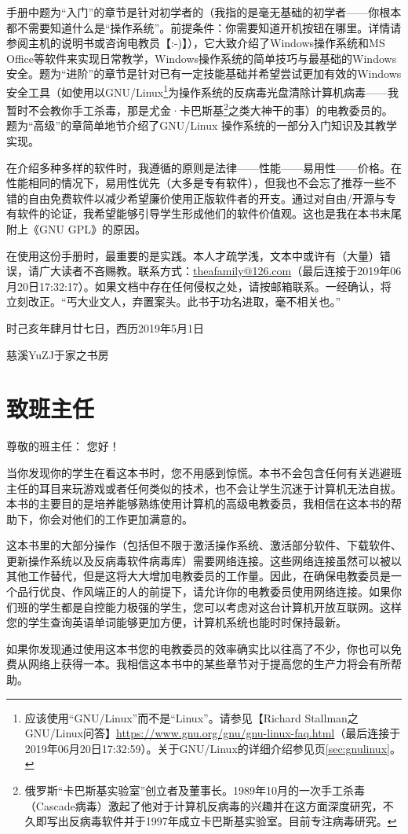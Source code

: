 手册中题为“入门”的章节是针对初学者的（我指的是毫无基础的初学者——你根本都不需要知道什么是“操作系统”。前提条件：你需要知道开机按钮在哪里。详情请参阅主机的说明书或咨询电教员【:-)】），它大致介绍了Windows操作系统和MS Office等软件来实现日常教学，Windows操作系统的简单技巧与最基础的Windows安全。题为“进阶”的章节是针对已有一定技能基础并希望尝试更加有效的Windows安全工具（如使用以GNU/Linux\footnote{应该使用“GNU/Linux”而不是“Linux”。请参见【Richard Stallman之GNU/Linux问答】\url{https://www.gnu.org/gnu/gnu-linux-faq.html}（最后连接于2019年06月20日17:32:59）。关于GNU/Linux的详细介绍参见\pageref{sec:gnulinux}页\ref{sec:gnulinux}。}为操作系统的反病毒光盘清除计算机病毒——我暂时不会教你手工杀毒，那是尤金·卡巴斯基\footnote{俄罗斯“卡巴斯基实验室”创立者及董事长。1989年10月的一次手工杀毒（Cascade病毒）激起了他对于计算机反病毒的兴趣并在这方面深度研究，不久即写出反病毒软件并于1997年成立卡巴斯基实验室。目前专注病毒研究。}之类大神干的事）的电教委员的。题为“高级”的章简单地节介绍了GNU/Linux 操作系统的一部分入门知识及其教学实现。\par
在介绍多种多样的软件时，我遵循的原则是法律——性能——易用性——价格。在性能相同的情况下，易用性优先（大多是专有软件），但我也不会忘了推荐一些不错的自由免费软件以减少希望廉价使用正版软件者的开支。通过对自由/开源与专有软件的论证，我希望能够引导学生形成他们的软件价值观。这也是我在本书末尾附上《GNU GPL》的原因。\par
 在使用这份手册时，最重要的是实践。本人才疏学浅，文本中或许有（大量）错误，请广大读者不吝赐教。联系方式：\url{theafamily@126.com}（最后连接于2019年06月20日17:32:17）。如果文档中存在任何侵权之处，请按邮箱联系。一经确认，将立刻改正。“丐大业文人，弃置案头。此书于功名进取，毫不相关也。”\par
时己亥年肆月廿七日，西历2019年5月1日\par
慈溪YuZJ于家之书房
\section{致班主任}
\noindent 尊敬的班主任：
您好！\par
当你发现你的学生在看这本书时，您不用感到惊慌。本书不会包含任何有关逃避班主任的耳目来玩游戏或者任何类似的技术，也不会让学生沉迷于计算机无法自拔。本书的主要目的是培养能够熟练使用计算机的高级电教委员，我相信在这本书的帮助下，你会对他们的工作更加满意的。\par
这本书里的大部分操作（包括但不限于激活操作系统、激活部分软件、下载软件、更新操作系统以及反病毒软件病毒库）需要网络连接。这些网络连接虽然可以被以其他工作替代，但是这将大大增加电教委员的工作量。因此，在确保电教委员是一个品行优良、作风端正的人的前提下，请允许你的电教委员使用网络连接。如果你们班的学生都是自控能力极强的学生，您可以考虑对这台计算机开放互联网。这样您的学生查询英语单词能够更加方便，计算机系统也能时时保持最新。\par
如果你发现通过使用这本书您的电教委员的效率确实比以往高了不少，你也可以免费从网络上获得一本。我相信这本书中的某些章节对于提高您的生产力将会有所帮助。
